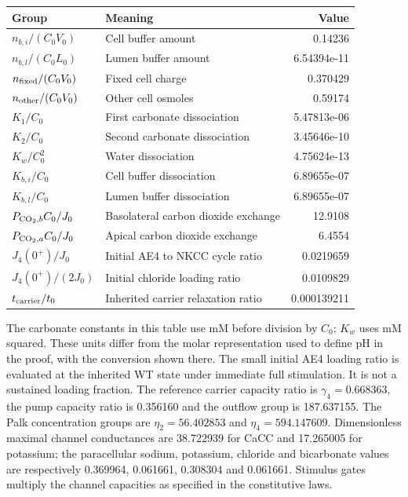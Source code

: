 \begin{center}\small

\begin{tabular}{llr}
\toprule
Group & Meaning & Value \\
\midrule
$n_{b,i}/(C_0V_0)$ & Cell buffer amount & 0.14236 \\
$n_{b,l}/(C_0L_0)$ & Lumen buffer amount & 6.54394e-11 \\
$n_{\rm fixed}/(C_0V_0)$ & Fixed cell charge & 0.370429 \\
$n_{\rm other}/(C_0V_0)$ & Other cell osmoles & 0.59174 \\
$K_1/C_0$ & First carbonate dissociation & 5.47813e-06 \\
$K_2/C_0$ & Second carbonate dissociation & 3.45646e-10 \\
$K_w/C_0^2$ & Water dissociation & 4.75624e-13 \\
$K_{b,i}/C_0$ & Cell buffer dissociation & 6.89655e-07 \\
$K_{b,l}/C_0$ & Lumen buffer dissociation & 6.89655e-07 \\
$P_{{\rm CO}_2,b}C_0/J_0$ & Basolateral carbon dioxide exchange & 12.9108 \\
$P_{{\rm CO}_2,a}C_0/J_0$ & Apical carbon dioxide exchange & 6.4554 \\
$J_4(0^+)/J_0$ & Initial AE4 to NKCC cycle ratio & 0.0219659 \\
$J_4(0^+)/(2J_0)$ & Initial chloride loading ratio & 0.0109829 \\
$t_{\rm carrier}/t_0$ & Inherited carrier relaxation ratio & 0.000139211 \\
\bottomrule
\end{tabular}


\end{center}
The carbonate constants in this table use mM before division by $C_0$;
$K_w$ uses mM squared. These units differ from the molar representation
used to define pH in the proof, with the conversion shown there.
The small initial AE4 loading ratio is evaluated at the inherited WT state
under immediate full stimulation. It is not a sustained loading fraction.
The reference carrier capacity ratio is $\gamma_4=0.668363$, the pump
capacity ratio is 0.356160 and the outflow group is 187.637155.
The Palk concentration groups are $\eta_2=56.402853$ and
$\eta_4=594.147609$. Dimensionless maximal channel conductances are
38.722939 for CaCC and 17.265005 for potassium; the paracellular sodium,
potassium, chloride and bicarbonate values are respectively 0.369964,
0.061661, 0.308304 and 0.061661. Stimulus gates multiply the channel
capacities as specified in the constitutive laws.

